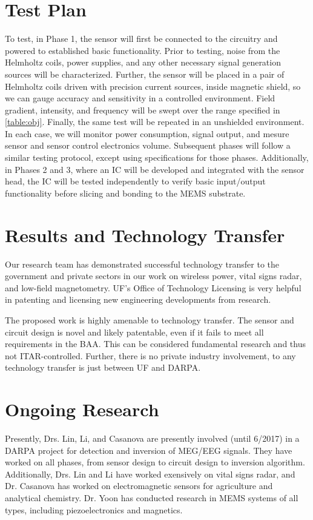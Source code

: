 \section{Test Plan}

To test, in Phase 1, the sensor will first be connected to the circuitry and powered to established basic functionality.  Prior to testing, noise from the Helmholtz coils, power supplies, and any other necessary signal generation sources will be characterized. Further, the sensor will be placed in a pair of Helmholtz coils driven with precision current sources, inside magnetic shield, so we can gauge accuracy and sensitivity in a controlled environment. Field gradient, intensity, and frequency will be swept over the range specified in \ref{table:obj}. Finally, the same test will be repeated in an unshielded environment. In each case, we will monitor power consumption, signal output, and mesure sensor and sensor control electronics volume. Subsequent phases will follow a similar testing protocol, except using specifications for those phases. Additionally, in Phases 2 and 3, where an IC will be developed and integrated with the sensor head, the IC will be tested independently to verify basic input/output functionality before slicing and bonding to the MEMS substrate.

\section{Results and Technology Transfer}

Our research team has demonstrated successful technology transfer to the government and private sectors in our work on wireless power, vital signs radar, and low-field magnetometry. UF's Office of Technology Licensing is very helpful in patenting and licensing new engineering developments from research.

The proposed work is highly amenable to technology transfer. The sensor and circuit design is novel and likely patentable, even if it fails to meet all requirements in the BAA. This can be considered fundamental research and thus not ITAR-controlled. Further, there is no private industry involvement, to any technology transfer is just between UF and DARPA.

\section{Ongoing Research}
Presently, Drs. Lin, Li, and Casanova are presently involved (until 6/2017) in a DARPA project for detection and inversion of MEG/EEG signals. They have worked on all phases, from sensor design to circuit design to inversion algorithm. Additionally, Drs. Lin and Li have worked exensively on vital signs radar, and Dr. Casanova has worked on electromagnetic sensors for agriculture and analytical chemistry. Dr. Yoon has conducted research in MEMS systems of all types, including piezoelectronics and magnetics. 

